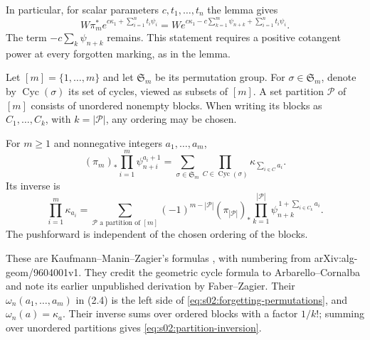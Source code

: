 In particular, for scalar parameters $c,t_1,\ldots,t_n$ the lemma gives
\begin{equation}
\label{eq:s02:tail-exponential}
W\pi_m^*e^{c\kappa_1+\sum_{i=1}^nt_i\psi_i}
=W e^{c\kappa_1-c\sum_{k=1}^m\psi_{n+k}+\sum_{i=1}^nt_i\psi_i}.
\end{equation}
The term $-c\sum_k\psi_{n+k}$ remains.  This statement requires a
positive cotangent power at every forgotten marking, as in the lemma.

Let $[m]=\{1,\ldots,m\}$ and let $\mathfrak S_m$ be its permutation
group.  For $\sigma\in\mathfrak S_m$, denote by
$\operatorname{Cyc}(\sigma)$ its set of cycles, viewed as subsets of
$[m]$.  A set partition $\mathcal P$ of $[m]$ consists of unordered
nonempty blocks.  When writing its blocks as $C_1,\ldots,C_k$, with
$k=|\mathcal P|$, any ordering may be chosen.

\begin{lmm}
\label{lmm:s02:forgetting-inversion}
For $m\geq1$ and nonnegative integers $a_1,\ldots,a_m$,
\begin{equation}
\label{eq:s02:forgetting-permutations}
(\pi_m)_*\prod_{i=1}^m\psi_{n+i}^{a_i+1}
=\sum_{\sigma\in\mathfrak S_m}
\prod_{C\in\operatorname{Cyc}(\sigma)}\kappa_{\sum_{i\in C}a_i}.
\end{equation}
Its inverse is
\begin{equation}
\label{eq:s02:partition-inversion}
\prod_{i=1}^m\kappa_{a_i}
=\sum_{\mathcal P\text{ a partition of }[m]}
(-1)^{m-|\mathcal P|}(\pi_{|\mathcal P|})_*
\prod_{k=1}^{|\mathcal P|}
\psi_{n+k}^{\,1+\sum_{i\in C_k}a_i}.
\end{equation}
The pushforward is independent of the chosen ordering of the blocks.
\end{lmm}

These are Kaufmann--Manin--Zagier's formulas
\cite[Theorem 2.2, (2.6), and Lemma 2.2.1, (2.8)]{KMZ96}, with
numbering from arXiv:alg-geom/9604001v1.  They credit the geometric
cycle formula to Arbarello--Cornalba and note its earlier unpublished
derivation by Faber--Zagier.  Their
$\omega_n(a_1,\ldots,a_m)$ in (2.4) is the left side of
\eqref{eq:s02:forgetting-permutations}, and $\omega_n(a)=\kappa_a$.
Their inverse sums over ordered blocks with a factor $1/k!$; summing
over unordered partitions gives \eqref{eq:s02:partition-inversion}.

